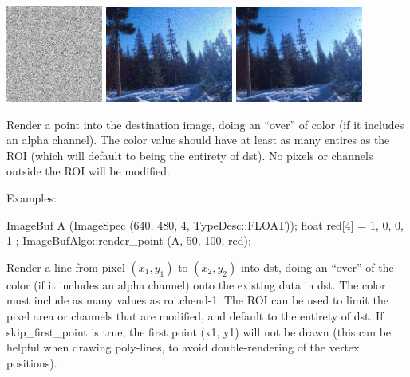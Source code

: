 \noindent
\includegraphics[width=1.25in]{figures/unifnoise1.jpg}
\spc \includegraphics[width=1.65in]{figures/tahoe-gauss.jpg} 
\spc \includegraphics[width=1.65in]{figures/tahoe-pepper.jpg}

\apiend


 
Render a point into the destination image,  doing an ``over'' of color (if
it includes an alpha channel). The {\cf color} value should have at least as
many entires as the ROI (which will default to being the entirety of
{\cf dst}). No pixels or channels outside the ROI will be modified.

\smallskip
\noindent Examples:
\begin{code}
    ImageBuf A (ImageSpec (640, 480, 4, TypeDesc::FLOAT));
    float red[4] = { 1, 0, 0, 1 };
    ImageBufAlgo::render_point (A, 50, 100, red);
\end{code}
\apiend


 
Render a line from pixel $(x_1,y_1)$ to $(x_2,y_2)$ into {\cf dst}, doing an
``over'' of the color (if it includes an alpha channel) onto the existing
data in {\cf dst}. The {\cf color} must include as many values as {\cf
roi.chend-1}. The ROI can be used to limit the pixel area or channels that
are modified, and default to the entirety of {\cf dst}. If {\cf skip_first_point}
is {\cf true}, the first point {\cf (x1, y1)} will not be drawn (this can
be helpful when drawing poly-lines, to avoid double-rendering of the
vertex positions).

